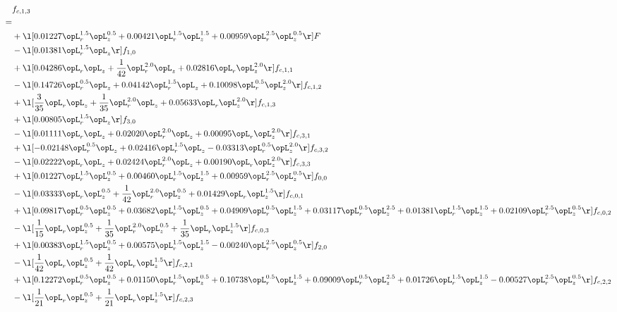 \begin{alignat}{2} 
\label{eq:f_13_1} 
& f_{c,1,3} \nonumber \\ 
 = \\ 
& + \l[  0.01227 \opL_r^{1.5} \opL_z^{0.5} +  0.00421 \opL_r^{1.5} \opL_z^{1.5} +  0.00959 \opL_r^{2.5} \opL_z^{0.5}  \r] F \nonumber \\ 
& - \l[  0.01381 \opL_r^{1.5} \opL_z  \r] f_{1,0} \nonumber \\ 
& + \l[  0.04286 \opL_r \opL_z + \frac{1}{42} \opL_r^{2.0} \opL_z +  0.02816 \opL_r \opL_z^{2.0}  \r] f_{c,1,1} \nonumber \\ 
& - \l[  0.14726 \opL_r^{0.5} \opL_z +  0.04142 \opL_r^{1.5} \opL_z +  0.10098 \opL_r^{0.5} \opL_z^{2.0}  \r] f_{c,1,2} \nonumber \\ 
& + \l[ \frac{3}{35} \opL_r \opL_z + \frac{1}{35} \opL_r^{2.0} \opL_z +  0.05633 \opL_r \opL_z^{2.0}  \r] f_{c,1,3} \nonumber \\ 
& + \l[  0.00805 \opL_r^{1.5} \opL_z  \r] f_{3,0} \nonumber \\ 
& - \l[  0.01111 \opL_r \opL_z +  0.02020 \opL_r^{2.0} \opL_z +  0.00095 \opL_r \opL_z^{2.0}  \r] f_{c,3,1} \nonumber \\ 
& + \l[  -0.02148 \opL_r^{0.5} \opL_z +  0.02416 \opL_r^{1.5} \opL_z   -0.03313 \opL_r^{0.5} \opL_z^{2.0}  \r] f_{c,3,2} \nonumber \\ 
& - \l[  0.02222 \opL_r \opL_z +  0.02424 \opL_r^{2.0} \opL_z +  0.00190 \opL_r \opL_z^{2.0}  \r] f_{c,3,3} \nonumber \\ 
& + \l[  0.01227 \opL_r^{1.5} \opL_z^{0.5} +  0.00460 \opL_r^{1.5} \opL_z^{1.5} +  0.00959 \opL_r^{2.5} \opL_z^{0.5}  \r] f_{0,0} \nonumber \\ 
& - \l[  0.03333 \opL_r \opL_z^{0.5} + \frac{1}{42} \opL_r^{2.0} \opL_z^{0.5} +  0.01429 \opL_r \opL_z^{1.5}  \r] f_{c,0,1} \nonumber \\ 
& + \l[  0.09817 \opL_r^{0.5} \opL_z^{0.5} +  0.03682 \opL_r^{1.5} \opL_z^{0.5} +  0.04909 \opL_r^{0.5} \opL_z^{1.5} +  0.03117 \opL_r^{0.5} \opL_z^{2.5} +  0.01381 \opL_r^{1.5} \opL_z^{1.5} +  0.02109 \opL_r^{2.5} \opL_z^{0.5}  \r] f_{c,0,2} \nonumber \\ 
& - \l[ \frac{1}{15} \opL_r \opL_z^{0.5} + \frac{1}{35} \opL_r^{2.0} \opL_z^{0.5} + \frac{1}{35} \opL_r \opL_z^{1.5}  \r] f_{c,0,3} \nonumber \\ 
& + \l[  0.00383 \opL_r^{1.5} \opL_z^{0.5} +  0.00575 \opL_r^{1.5} \opL_z^{1.5}   -0.00240 \opL_r^{2.5} \opL_z^{0.5}  \r] f_{2,0} \nonumber \\ 
& - \l[ \frac{1}{42} \opL_r \opL_z^{0.5} + \frac{1}{42} \opL_r \opL_z^{1.5}  \r] f_{c,2,1} \nonumber \\ 
& + \l[  0.12272 \opL_r^{0.5} \opL_z^{0.5} +  0.01150 \opL_r^{1.5} \opL_z^{0.5} +  0.10738 \opL_r^{0.5} \opL_z^{1.5} +  0.09009 \opL_r^{0.5} \opL_z^{2.5} +  0.01726 \opL_r^{1.5} \opL_z^{1.5}   -0.00527 \opL_r^{2.5} \opL_z^{0.5}  \r] f_{c,2,2} \nonumber \\ 
& - \l[ \frac{1}{21} \opL_r \opL_z^{0.5} + \frac{1}{21} \opL_r \opL_z^{1.5}  \r] f_{c,2,3} \nonumber \\ 
\end{alignat} 


